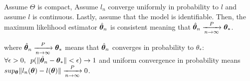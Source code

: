 \begin{proposition}
  \label{prop:mse_consistent}
  Assume $\Theta$ is compact, 
  Assume $l_n$ converge uniformly in probability to $l$
  and assume $l$ is continuous.
  Lastly, assume that the model is identifiable.
  Then, the maximum likelihood estimator  $\hat{\boldsymbol{\theta}}_n$ is consistent
  meaning that $\hat{\boldsymbol{\theta}}_n \xrightarrow[n \rightarrow \infty]{P}  \boldsymbol{\theta}_*$.
\end{proposition}
where $\hat{\boldsymbol{\theta}}_n \xrightarrow[n \rightarrow \infty]{P}  \boldsymbol{\theta}_*$ means
that $\hat{\boldsymbol{\theta}}_n$ converges in probability to $\theta_*$:  $\forall \epsilon > 0, \enspace p(\| \hat{\boldsymbol{\theta}}_n - \boldsymbol{\theta}_* \| < \epsilon) \rightarrow 1$
and uniform convergence in probability means $sup_{\boldsymbol{\theta}} \|l_n(\boldsymbol{\theta}) -
l(\boldsymbol{\theta})\| \xrightarrow[n \rightarrow \infty]{P} 0$.
